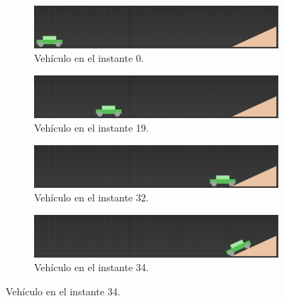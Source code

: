 \documentclass{article}
\begin{document}

\begin{figure}[H]
    \centering
    \begin{subfigure}[H]{0.48\textwidth}
        \centering
        \includegraphics[width=\textwidth]{imagenes/Ejercicio2/corregidas/keyframes/0.png}
        \caption{Vehículo en el instante 0.}
    \end{subfigure}
    \hfill
    \begin{subfigure}[H]{0.48\textwidth}
        \centering
        \includegraphics[width=\textwidth]{imagenes/Ejercicio2/corregidas/keyframes/19.png}
        \caption{Vehículo en el instante 19.}
    \end{subfigure}
    \par\bigskip
    \begin{subfigure}[H]{0.48\textwidth}
        \centering
        \includegraphics[width=\textwidth]{imagenes/Ejercicio2/corregidas/keyframes/32.png}
        \caption{Vehículo en el instante 32.}
    \end{subfigure}
    \hfill
    \begin{subfigure}[H]{0.48\textwidth}
        \centering
        \includegraphics[width=\textwidth]{imagenes/Ejercicio2/corregidas/keyframes/34.png}
        \caption{Vehículo en el instante 34.}
    \end{subfigure}
    \par\bigskip

\end{figure}
\end{document}
